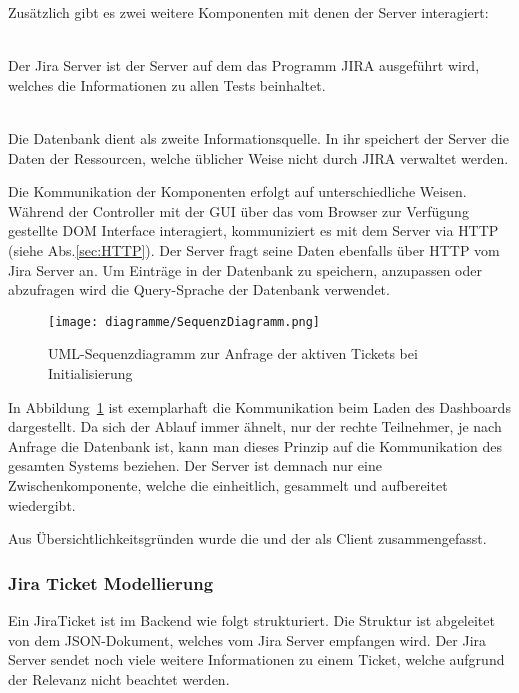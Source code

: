 Zusätzlich gibt es zwei weitere Komponenten mit denen der Server interagiert:

\begin{description}
    \hfill\\
    Der Jira Server ist der Server auf dem das Programm \gls{JIRA} ausgeführt wird, 
    welches die Informationen zu allen Tests beinhaltet.

    \hfill\\
    Die Datenbank dient als zweite Informationsquelle. In ihr speichert der Server
    die Daten der Ressourcen, welche üblicher Weise nicht durch \gls{JIRA} verwaltet
    werden.
\end{description}

Die Kommunikation der Komponenten erfolgt auf unterschiedliche Weisen. Während 
der Controller mit der GUI über das vom Browser zur Verfügung gestellte \gls{DOM}
Interface interagiert, kommuniziert es mit dem Server via \gls{HTTP} (siehe Abs.\ref{sec:HTTP}).
Der Server fragt seine Daten ebenfalls über HTTP vom Jira Server an. Um Einträge
in der Datenbank zu speichern, anzupassen oder abzufragen wird die Query-Sprache
der Datenbank verwendet.

\begin{figure}[H]
    \texttt{[image: diagramme/SequenzDiagramm.png]}
    \caption{UML-Sequenzdiagramm zur Anfrage der aktiven Tickets bei Initialisierung}\label{fig:sequenz}
\end{figure}

In Abbildung~\ref{fig:sequenz} ist exemplarhaft die Kommunikation beim Laden des Dashboards 
dargestellt. Da sich der Ablauf immer ähnelt, nur der rechte Teilnehmer, je nach 
Anfrage die Datenbank ist, kann man dieses Prinzip auf die Kommunikation des gesamten
Systems beziehen. Der Server ist demnach nur eine Zwischenkomponente, welche die
einheitlich, gesammelt und aufbereitet wiedergibt.

Aus Übersichtlichkeitsgründen wurde die 
und der  als Client zusammengefasst.\\

\subsubsection{Jira Ticket Modellierung}
Ein JiraTicket ist im Backend wie folgt strukturiert. Die Struktur ist abgeleitet 
von dem \gls{JSON}-Dokument, welches vom Jira Server empfangen wird. Der Jira Server
sendet noch viele weitere Informationen zu einem Ticket, welche aufgrund der Relevanz
nicht beachtet werden.

